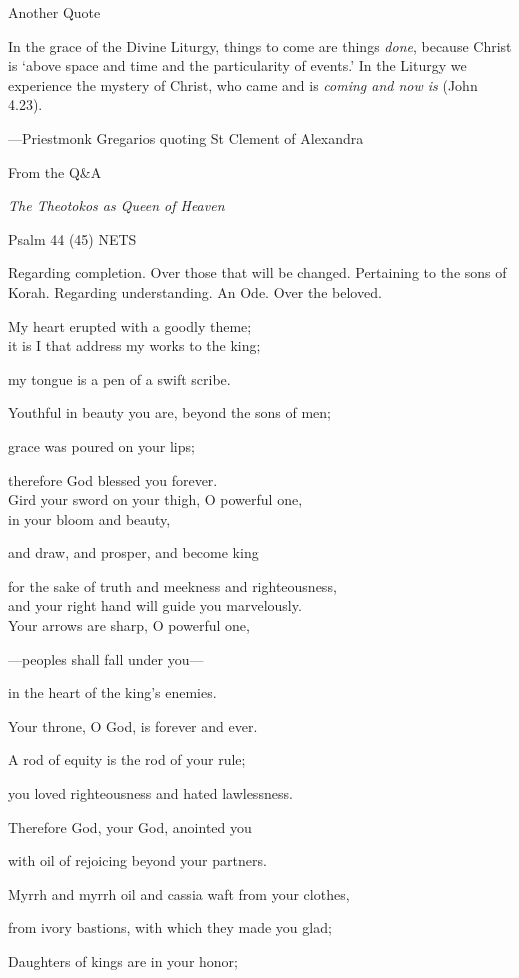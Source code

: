 \documentclass[
]{article}
\newcommand{\RL}[1]{\beginR #1\endR}
\begin{document}
Another Quote

In the grace of the Divine Liturgy, things to come are things
\emph{done}, because Christ is `above space and time and the
particularity of events.' In the Liturgy we experience the mystery of
Christ, who came and is \emph{coming and now is} (John 4.23).

---Priestmonk Gregarios quoting St Clement of Alexandra

From the Q\&A

\emph{The Theotokos as Queen of Heaven}

Psalm 44 (45) NETS

Regarding completion. Over those that will be changed. Pertaining to the
sons of Korah. Regarding understanding. An Ode. Over the beloved.

My heart erupted with a goodly theme;\\
it is I that address my works to the king;

my tongue is a pen of a swift scribe.

Youthful in beauty you are, beyond the sons of men;

grace was poured on your lips;

therefore God blessed you forever.\\
Gird your sword on your thigh, O powerful one,\\
in your bloom and beauty,

and draw, and prosper, and become king

for the sake of truth and meekness and righteousness,\\
and your right hand will guide you marvelously.\\
Your arrows are sharp, O powerful one,

---peoples shall fall under you---

in the heart of the king\RL{'}s enemies.

Your throne, O God, is forever and ever.

A rod of equity is the rod of your rule;

you loved righteousness and hated lawlessness.

Therefore God, your God, anointed you

with oil of rejoicing beyond your partners.

Myrrh and myrrh oil and cassia waft from your clothes,

from ivory bastions, with which they made you glad;

Daughters of kings are in your honor;
\end{document}
